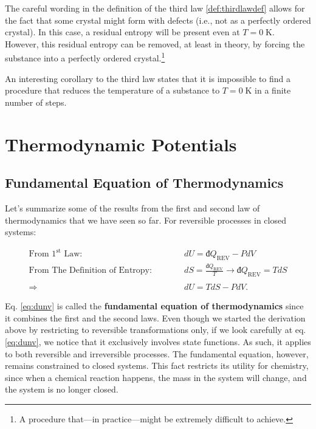 \documentclass[
]{book}
\theoremstyle{definition}
\theoremstyle{definition}
\theoremstyle{definition}
\theoremstyle{remark}
\begin{document}
The careful wording in the definition of the third law \ref{def:thirdlawdef} allows for the fact that some crystal might form with defects (i.e., not as a perfectly ordered crystal). In this case, a residual entropy will be present even at \(T=0 \; \text{K}\). However, this residual entropy can be removed, at least in theory, by forcing the substance into a perfectly ordered crystal.\footnote{A procedure that---in practice---might be extremely difficult to achieve.}

An interesting corollary to the third law states that it is impossible to find a procedure that reduces the temperature of a substance to \(T=0 \; \text{K}\) in a finite number of steps.

\hypertarget{Potentials}{%
\chapter{Thermodynamic Potentials}\label{Potentials}}

\hypertarget{fundeq}{%
\section{Fundamental Equation of Thermodynamics}\label{fundeq}}

Let's summarize some of the results from the first and second law of thermodynamics that we have seen so far. For reversible processes in closed systems:

\begin{equation}
\begin{aligned}
\text{From 1}^{\text{st}} \text{ Law:} \qquad \quad & dU = đQ_{\mathrm{REV}}-PdV \\
\text{From The Definition of Entropy:} \qquad \quad & dS = \frac{đQ_{\mathrm{REV}}}{T} \rightarrow đQ_{\mathrm{REV}} = TdS \\
\\
\Rightarrow \quad & dU = TdS - PdV.
\end{aligned}
\label{eq:dunv}
\end{equation}

Eq. \eqref{eq:dunv} is called the \textbf{fundamental equation of thermodynamics} since it combines the first and the second laws. Even though we started the derivation above by restricting to reversible transformations only, if we look carefully at eq. \eqref{eq:dunv}, we notice that it exclusively involves state functions. As such, it applies to both reversible and irreversible processes. The fundamental equation, however, remains constrained to closed systems. This fact restricts its utility for chemistry, since when a chemical reaction happens, the mass in the system will change, and the system is no longer closed.
\end{document}
